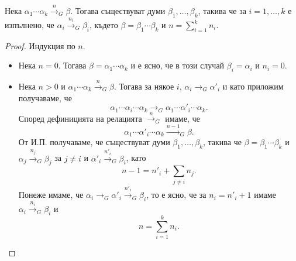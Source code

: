 \begin{framed}
  \begin{prop}
    \label{pr:grammar:divide}
    Нека $\alpha_1\cdots \alpha_k \stackrel{n}{\to}_G \beta$.
    Тогава съществуват думи $\beta_1,\dots,\beta_k$, такива че за $i = 1,\dots, k$ е изпълнено, че
    $\alpha_i \stackrel{n_i}{\to}_G \beta_i$, където $\beta = \beta_1\cdots \beta_k$ и $n = \sum^k_{i = 1}n_i$.
  \end{prop}
\end{framed}
\begin{proof}
  Индукция по $n$.
  \begin{itemize}
  \item
    Нека $n = 0$. Тогава $\beta = \alpha_1 \cdots \alpha_k$ и е ясно, че в този случай $\beta_i = \alpha_i$ и $n_i = 0$.
  \item
    Нека $n > 0$ и $\alpha_1\cdots \alpha_k \stackrel{n}{\to}_G \beta$. Тогава за някое $i$, $\alpha_i \to_G \alpha'_i$ и
    като приложим  получаваме, че
    \[\alpha_1\cdots\alpha_i\cdots\alpha_k \to_G \alpha_1\cdots\alpha'_i\cdots\alpha_k.\]
    Според дефиницията на релацията $\stackrel{n}{\to}_G$ имаме, че
    \[\alpha_1\cdots\alpha'_i\cdots\alpha_k \stackrel{n-1}{\to}_G \beta.\]
    От И.П. получаваме, че съществуват думи $\beta_1,\dots,\beta_k$, такива че $\beta = \beta_1 \cdots \beta_k$
    и $\alpha_j \stackrel{n_j}{\to}_G \beta_j$ за $j \neq i$ и $\alpha'_i \stackrel{n'_i}{\to}_G \beta_i$, като
    \[n-1 = n'_i + \sum_{j\neq i} n_j.\]
    Понеже имаме, че $\alpha_i \to_G \alpha'_i \stackrel{n'_i}{\to}_G \beta_i$,
    то е ясно, че за $n_i = n'_i + 1$ имаме $\alpha_i \stackrel{n_i}{\to}_G \beta_i$ и
    \[n = \sum^{k}_{i=1} n_i.\]
  \end{itemize}
\end{proof}


